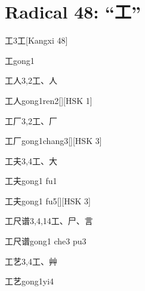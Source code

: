 
\section*{Radical 48: ``⼯''}

\begin{entry}{工}{3}{⼯}[Kangxi 48]
  \begin{phonetics}{工}{gong1}
  \end{phonetics}
\end{entry}

\begin{entry}{工人}{3,2}{⼯、⼈}
  \begin{phonetics}{工人}{gong1ren2}[][HSK 1]
  \end{phonetics}
\end{entry}

\begin{entry}{工厂}{3,2}{⼯、⼚}
  \begin{phonetics}{工厂}{gong1chang3}[][HSK 3]
  \end{phonetics}
\end{entry}

\begin{entry}{工夫}{3,4}{⼯、⼤}
  \begin{phonetics}{工夫}{gong1 fu1}
  \end{phonetics}
  \begin{phonetics}{工夫}{gong1 fu5}[][HSK 3]
  \end{phonetics}
\end{entry}

\begin{entry}{工尺谱}{3,4,14}{⼯、⼫、⾔}
  \begin{phonetics}{工尺谱}{gong1 che3 pu3}
  \end{phonetics}
\end{entry}

\begin{entry}{工艺}{3,4}{⼯、⾋}
  \begin{phonetics}{工艺}{gong1yi4}
  \end{phonetics}
\end{entry}

